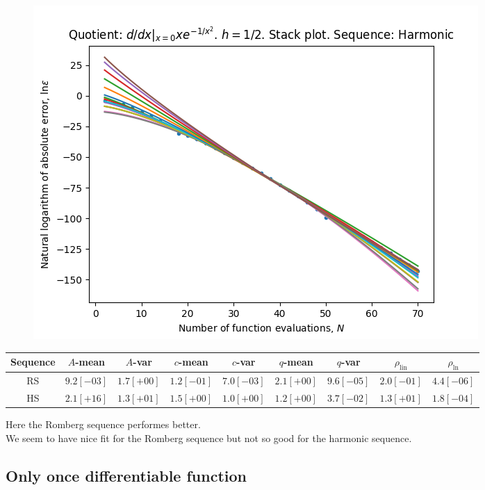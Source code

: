 \begin{figure}[H]
\centering
\begin{minipage}{0.45\textwidth}
\centering
\includegraphics[scale=0.45]{../results/diff_quot_plots/xemxm2_hp_harmonic_stack.png}
\end{minipage}
\end{figure}

\begin{table}[H]
    \centering
    \small
    \begin{tabular}{c||c|c|c|c|c|c|c|c}
Sequence & \(A\)-mean & \(A\)-var & \(c\)-mean & \(c\)-var & \(q\)-mean & \(q\)-var & \(\rho_{\operatorname{lin}}\) & \(\rho_{\ln}\)\\\hline
\rowcolor{green}
RS & \(9.2[-03]\) & \(1.7[+00]\) & \(1.2[-01]\) & \(7.0[-03]\) & \(2.1[+00]\) & \(9.6[-05]\) & \(2.0[-01]\) & \(4.4[-06]\) \\
\rowcolor{red}
HS & \(2.1[+16]\) & \(1.3[+01]\) & \(1.5[+00]\) & \(1.0[+00]\) & \(1.2[+00]\) & \(3.7[-02]\) & \(1.3[+01]\) & \(1.8[-04]\) \\
	\end{tabular}    
    \label{tab:my_label}
\end{table}

Here the Romberg sequence performes better.\\

We seem to have nice fit for the Romberg sequence but not so good for the harmonic sequence.

\subsection{Only once differentiable function}


